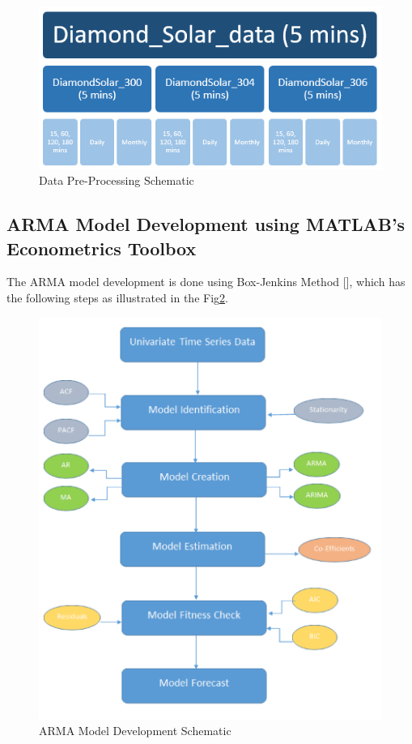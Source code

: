\documentclass[journal]{IEEEtran}
\begin{document}
\begin{figure}[H]
\centering
\includegraphics[scale=0.65]{DataTransformationSchematic.png}
\caption{Data Pre-Processing Schematic}
\label{fig2} %
\end{figure}

\subsection{ARMA Model Development using MATLAB’s Econometrics Toolbox}

The ARMA model development is done using Box-Jenkins Method [], which has the following steps as illustrated in the Fig\ref{fig3}.


\begin{figure}[H]
\centering
\includegraphics[scale=0.75]{ARMASteps.png}
\caption{ARMA Model Development Schematic}
\label{fig3} %
\end{figure}
\end{document}
